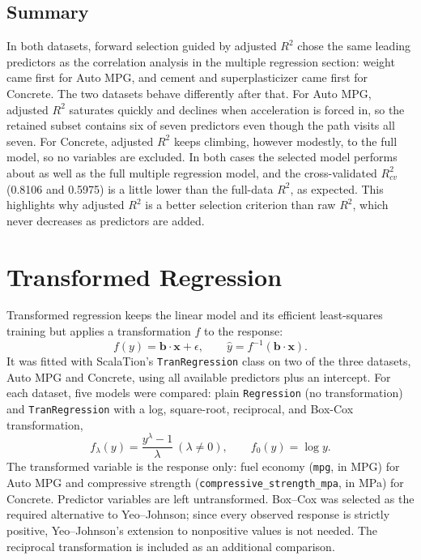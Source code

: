 \documentclass{article}
\begin{document}
\subsection{Summary}

In both datasets, forward selection guided by adjusted $R^2$ chose the same leading predictors as the correlation analysis in the multiple regression section: weight came first for Auto MPG, and cement and superplasticizer came first for Concrete. The two datasets behave differently after that. For Auto MPG, adjusted $R^2$ saturates quickly and declines when acceleration is forced in, so the retained subset contains six of seven predictors even though the path visits all seven. For Concrete, adjusted $R^2$ keeps climbing, however modestly, to the full model, so no variables are excluded. In both cases the selected model performs about as well as the full multiple regression model, and the cross-validated $R^2_{cv}$ (0.8106 and 0.5975) is a little lower than the full-data $R^2$, as expected. This highlights why adjusted $R^2$ is a better selection criterion than raw $R^2$, which never decreases as predictors are added.

\section{Transformed Regression}


Transformed regression keeps the linear model and its efficient least-squares training but applies a transformation $f$ to the response:
\[
f(y) = \mathbf{b}\cdot\mathbf{x} + \epsilon, \qquad \hat{y} = f^{-1}(\mathbf{b}\cdot\mathbf{x}).
\]
It was fitted with ScalaTion's \texttt{TranRegression} class on two of the three datasets, Auto MPG and Concrete, using all available predictors plus an intercept. For each dataset, five models were compared: plain \texttt{Regression} (no transformation) and \texttt{TranRegression} with a log, square-root, reciprocal, and Box-Cox transformation,
\[
f_\lambda(y) = \frac{y^{\lambda}-1}{\lambda}\ (\lambda \neq 0), \qquad f_0(y) = \log y .
\]
The transformed variable is the response only: fuel economy (\texttt{mpg}, in MPG) for Auto MPG and compressive strength (\texttt{compressive\_strength\_mpa}, in MPa) for Concrete. Predictor variables are left untransformed. Box--Cox was selected as the required alternative to Yeo--Johnson; since every observed response is strictly positive, Yeo--Johnson's extension to nonpositive values is not needed. The reciprocal transformation is included as an additional comparison.
\end{document}
